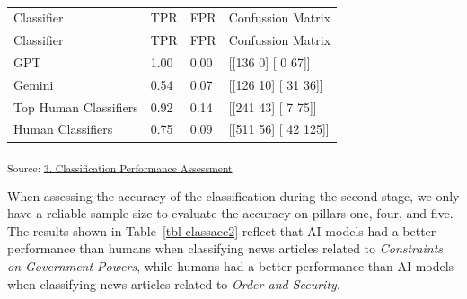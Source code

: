 \documentclass[
]{agujournal2019}
\begin{document}
\begin{longtable}[]{@{}llll@{}}

\caption{\label{tbl-classacc1}Classification Performance Assessment
(Stage 1)}

\tabularnewline

\caption{}\label{T_54c07}\tabularnewline
\toprule\noalign{}
Classifier & TPR & FPR & Confussion Matrix \\
\midrule\noalign{}
\endfirsthead
\toprule\noalign{}
Classifier & TPR & FPR & Confussion Matrix \\
\midrule\noalign{}
\endhead
\bottomrule\noalign{}
\endlastfoot
GPT & 1.00 & 0.00 & {[}{[}136 0{]} {[} 0 67{]}{]} \\
Gemini & 0.54 & 0.07 & {[}{[}126 10{]} {[} 31 36{]}{]} \\
Top Human Classifiers & 0.92 & 0.14 & {[}{[}241 43{]} {[} 7 75{]}{]} \\
Human Classifiers & 0.75 & 0.09 & {[}{[}511 56{]} {[} 42 125{]}{]} \\

\end{longtable}

\textsubscript{Source:
\href{https://ctoruno.github.io/eu-rol-tracker/notebooks/3_EU_news_classification_accuracy-preview.html\#cell-tbl-classacc1}{3.
Classification Performance Assessment}}

When assessing the accuracy of the classification during the second
stage, we only have a reliable sample size to evaluate the accuracy on
pillars one, four, and five. The results shown in
Table~\ref{tbl-classacc2} reflect that AI models had a better
performance than humans when classifying news articles related to
\emph{Constraints on Government Powers}, while humans had a better
performance than AI models when classifying news articles related to
\emph{Order and Security}.
\end{document}
